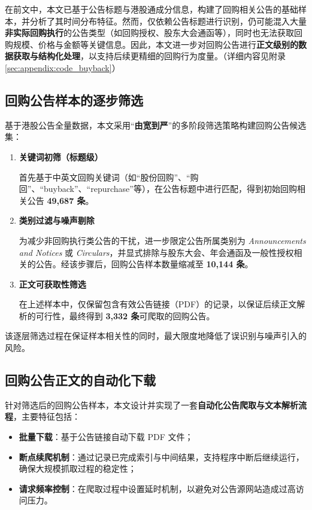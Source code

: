 \documentclass[a4paper,10pt]{article}
\begin{document}
在前文中，本文已基于公告标题与港股通成分信息，构建了回购相关公告的基础样本，并分析了其时间分布特征。然而，仅依赖公告标题进行识别，仍可能混入大量\textbf{非实际回购执行}的公告类型（如回购授权、股东大会通函等），同时也无法获取回购规模、价格与金额等关键信息。因此，本文进一步对回购公告进行\textbf{正文级别的数据获取与结构化处理}，以支持后续更精细的回购行为度量。（详细内容见附录\ref{sec:appendix:code_buyback}）

\subsection{回购公告样本的逐步筛选}

基于港股公告全量数据，本文采用“\textbf{由宽到严}”的多阶段筛选策略构建回购公告候选集：

\begin{enumerate}
    \item \textbf{关键词初筛（标题级）}
    
    首先基于中英文回购关键词（如“股份回购”、“购回”、“buyback”、“repurchase”等），在公告标题中进行匹配，得到初始回购相关公告 \textbf{49,687 条}。

    \item \textbf{类别过滤与噪声剔除}
    
    为减少非回购执行类公告的干扰，进一步限定公告所属类别为 \textit{Announcements and Notices} 或 \textit{Circulars}，并显式排除与股东大会、年会通函及一般性授权相关的公告。经该步骤后，回购公告样本数量缩减至 \textbf{10,144 条}。

    \item \textbf{正文可获取性筛选}
    
    在上述样本中，仅保留包含有效公告链接（PDF）的记录，以保证后续正文解析的可行性，最终得到 \textbf{3,332 条}可爬取的回购公告。
\end{enumerate}

该逐层筛选过程在保证样本相关性的同时，最大限度地降低了误识别与噪声引入的风险。

\subsection{回购公告正文的自动化下载}

针对筛选后的回购公告样本，本文设计并实现了一套\textbf{自动化公告爬取与文本解析流程}，主要特征包括：

\begin{itemize}
    \item \textbf{批量下载}：基于公告链接自动下载 PDF 文件；
    \item \textbf{断点续爬机制}：通过记录已完成索引与中间结果，支持程序中断后继续运行，确保大规模抓取过程的稳定性；
    \item \textbf{请求频率控制}：在爬取过程中设置延时机制，以避免对公告源网站造成过高访问压力。
\end{itemize}
\end{document}
